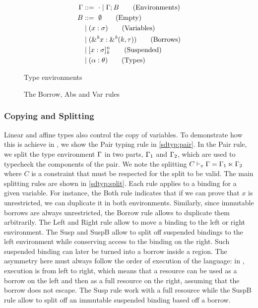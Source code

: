 \begin{figure}[!h]
  \begin{minipage}{0.33\linewidth}
    \begin{align*}
      \Gamma &::=\ \cdot \mid \Gamma;B\tag{Environments}\\
      B &::=\ \emptyset \tag{Empty} \\
         &\mid (x : \sigma)\tag{Variables}\\
         &\mid ({\&}^{\textit{b}}x : {\&}^{\textit{b}}(k,\tau))\tag{Borrows}\\
         &\mid [x : \sigma]_{\textit{b}}^n \tag{Suspended}\\
         &\mid (\alpha : \theta)\tag{Types}
    \end{align*}
    \caption{Type environments}
    \label{grammar:env}
  \end{minipage}\hfill
  \begin{minipage}{0.65\linewidth}
    \caption{The {\sc Borrow}, {\sc Abs} and {\sc Var} rules}
    \label{selectrules:borrow}
    \label{selectrules:binders}
  \end{minipage}
\end{figure}



\subsubsection{Copying and Splitting}
\label{sdtyping:split}

Linear and affine types also control the copy of variables.
To demonstrate how this is achieve in \lang, we show the
{\sc Pair} typing rule in \cref{sdtyp:pair}.
In the {\sc Pair} rule, we split the type environment $\Gamma$ in two parts,
$\Gamma_1$ and $\Gamma_2$, which are used to typecheck the components of the pair.
We note the splitting $C \vdash_e \Gamma = \Gamma_1 \ltimes \Gamma_2$ where $C$ is a constraint
that must be respected for the split to be valid.
The main splitting rules are shown in \cref{sdtyp:split}. Each
rule applies to a binding for a given variable. For instance, the
{\sc Both} rule indicates that if we can prove that $x$ is unrestricted, we
can duplicate it in both environments.
Similarly, since immutable borrows are always unrestricted, the
{\sc Borrow} rule allows to duplicate them arbitrarily.
The {\sc Left} and {\sc Right} rule allow to move a binding
to the left or right environment.
The {\sc Susp} and {\sc SuspB} allow to split off suspended bindings to
the left environment while conserving access to the binding on the right.
Such suspended binding can later be turned
into a borrow inside a region. The asymmetry here must always follow
the order of execution of the language: in \affe, execution is from left to
right, which means that a resource can be used as a borrow on the left
and then as a full resource on the right, assuming that the borrow does not
escape. The {\sc Susp} rule work with a full resource while the {\sc SuspB}
rule allow to split off an immutable suspended binding based off a borrow.

